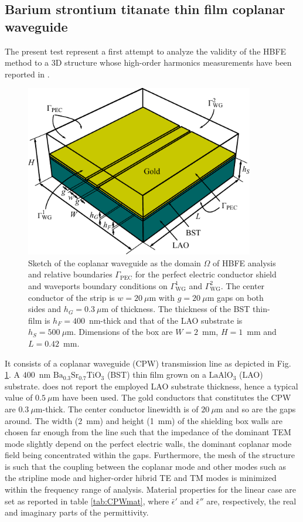 \subsection{Barium strontium titanate thin film coplanar waveguide}

The present test represent a first attempt to analyze the validity of the HBFE method to a 3D structure whose high-order harmonics measurements have been reported in \cite{mateu2006measurements}. 

\begin{figure}[ht!]
\centering
\includegraphics[width=10cm]{CPW}
\caption{Sketch of the coplanar waveguide as the domain $\Omega$ of HBFE analysis and relative boundaries $\Gamma_\text{PEC}$ for the perfect electric conductor shield and waveports boundary conditions on $\Gamma_\text{WG}^1$ and $\Gamma_\text{WG}^2$. The center conductor of the strip is $w = 20~{\mu}$m with $g = 20~{\mu}$m gaps on both sides and $h_G = 0.3~{\mu}$m of thickness. The thickness of the BST thin-film is $h_F = 400$~nm-thick and that of the LAO substrate is $h_S = 500~{\mu}$m. Dimensions of the box are $W=2$~mm, $H=1$~mm and $L=0.42$~mm.}
\label{fig:CPW}
\end{figure}

It consists of a coplanar waveguide (CPW) transmission line as depicted in Fig. \ref{fig:CPW}. A $400$~nm $\text{Ba}_{0.3}\text{Sr}_{0.7}\text{TiO}_{3}$ (BST) thin film grown on a $\text{LaAlO}_3$ (LAO) substrate. \cite{mateu2006measurements} does not report the employed LAO substrate thickness, hence a typical value of $0.5~{\mu}$m \cite{gim2000microstructure} have been used. The gold conductors that constitutes the CPW are $0.3~{\mu}$m-thick. The center conductor linewidth is of $20~{\mu}$m and so are the gaps around. The width (2~mm) and height (1~mm) of the shielding box walls are chosen far enough from the line such that the impedance of the dominant TEM mode slightly depend on the perfect electric walls, the dominant coplanar mode field being concentrated within the gaps. Furthermore, the mesh of the structure is such that the coupling between the coplanar mode and other modes such as the stripline mode and higher-order hibrid TE and TM modes is minimized within the frequency range of analysis. 
Material properties for the linear case are set as reported in table \ref{tab:CPWmat}, where $\bar{\epsilon}'$ and $\bar{\epsilon}''$ are, respectively, the real and imaginary parts of the permittivity.


